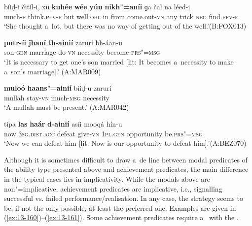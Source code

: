 \begin{exe}
\ex
\label{ex:13-156}
\gll bíiḍ-i čitíl-i, xu \textbf{kuhée} \textbf{wée} \textbf{yúu} \textbf{  nikh"=aníi} ɡa čal na léed-i  \\
much-\textsc{f} think.\textsc{pfv-f} but well.\textsc{obl} in from  come.out-\textsc{vn} any trick \textsc{neg} find.\textsc{pfv-f}  \\
\glt `She thought a~lot, but there was no way of getting out of the well.'\newline (B:FOX013)

\ex
\label{ex:13-157}
\gll \textbf{putr-íi} \textbf{ǰhaní} \textbf{th-ainií} zarurí bh-áan-u \\
son-\textsc{gen} marriage do-\textsc{vn} necessity become-\textsc{prs"=msg}  \\
\glt `It is necessary to get one's son married [lit: It becomes a~necessity to make a~son's marriage].' (A:MAR009)

\ex
\label{ex:13-158}
\gll \textbf{muloó} \textbf{haans"=ainií} bíiḍ-u zarurí \\
mullah stay-\textsc{vn}  much-\textsc{msg} necessity  \\
\glt `A mullah must be present.' (A:MAR042)

\ex
\label{ex:13-159}
\gll típa \textbf{las} \textbf{haár} \textbf{d-ainií} asíi mooqá  hín-u \\
now \textsc{3sg.dist.acc} defeat give-\textsc{vn} \textsc{1pl.gen} opportunity be.\textsc{prs"=msg}  \\
\glt `Now we can defeat him [lit: Now is our opportunity to defeat him].'\newline (A:BEZ070) 
\end{exe}

 Although it is sometimes difficult to draw a~de line between modal predicates of the ability type presented above and achievement predicates, the main difference in the typical cases lies in implicativity. While the modals above are non"=implicative, achievement predicates are implicative, i.e., signalling successful vs. failed performance/realisation. In any case, the  strategy seems to be, if not the only possible, at least the preferred one. Examples are given in (\ref{ex:13-160})--(\ref{ex:13-161}). Some achievement predicates require a~ with the .

